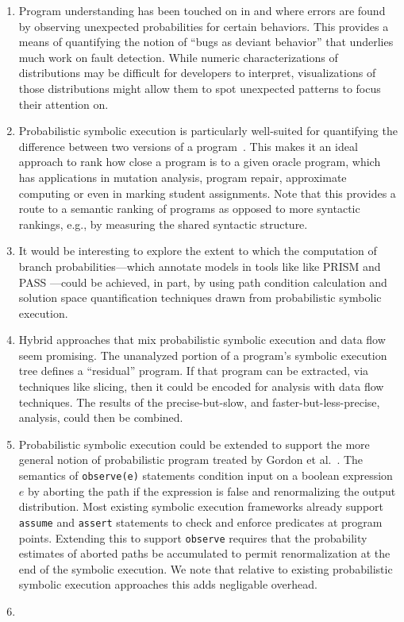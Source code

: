 \begin{enumerate}

\item Program understanding has been touched on in \cite{Geldenhuys2012} and \cite{Filieri2015} where errors are found by observing unexpected probabilities for certain behaviors.  This provides a means of quantifying the notion of ``bugs as deviant behavior'' that underlies much work on fault detection.   While numeric characterizations of distributions may be difficult for developers to interpret, visualizations of those distributions might allow them to spot unexpected patterns to focus their attention on.

\item Probabilistic symbolic execution is particularly well-suited for quantifying the difference between two versions of a program~\cite{Filieri2015b}. This makes it an ideal approach to rank how close a program is to a given oracle program, which has applications in mutation analysis, program repair, approximate computing or even in marking student assignments.  Note that this provides a route to a semantic ranking of programs as opposed to more syntactic rankings, e.g., by measuring the shared syntactic structure. 

\item It would be interesting to explore the extent
to which the computation of branch probabilities---which annotate
models in tools like like PRISM \cite{kwiatkowska2011prism} and 
PASS \cite{hahn2010pass}---could be achieved,
in part, by using path condition calculation and solution
space quantification techniques drawn from probabilistic symbolic
execution.  

\item Hybrid approaches that mix probabilistic symbolic execution
and data flow seem promising.  The unanalyzed portion of a program's
symbolic execution tree defines a ``residual'' program.  If that
program can be extracted, via techniques like slicing, then it
could be encoded for analysis with data flow techniques.  The
results of the precise-but-slow, and faster-but-less-precise,
analysis, could then be combined. 

\item Probabilistic symbolic execution could be extended to support
the more general notion of probabilistic program treated by Gordon 
et al.~\cite{Gordon2014}.  The semantics of
\texttt{observe(e)} statements condition input on a boolean expression
$e$ by aborting the path if the expression is false and renormalizing the
output distribution.
Most existing symbolic execution frameworks already support \texttt{assume} and \texttt{assert} statements to check and enforce predicates at program points.
Extending this to support \texttt{observe} requires that the probability
estimates of aborted paths be accumulated to permit renormalization at the
end of the symbolic execution.  We note that relative to existing probabilistic
symbolic execution approaches this adds negligable overhead.

\item {}

\end{enumerate}
